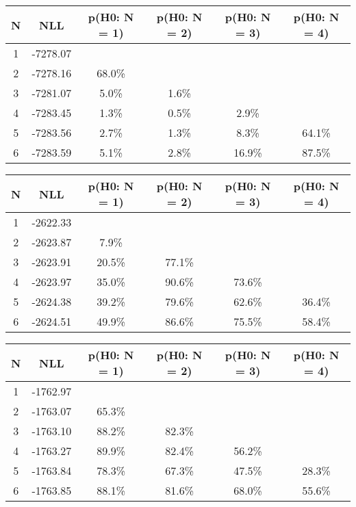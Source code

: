 \begin{table}[htb]
	\begin{center}
{\footnotesize\renewcommand{\arraystretch}{1.4}
		\begin{tabular}{cc||cccc}
			N & NLL & p(H0: N = 1) & p(H0: N = 2) & p(H0: N = 3) & p(H0: N = 4)\\ 
		\hline
1 & -7278.07 & & & & \\
2 & -7278.16 & 68.0\% & & & \\
3 & -7281.07 & 5.0\% & 1.6\% & & \\
4 & -7283.45 & 1.3\% & 0.5\% & 2.9\% & \\
5 & -7283.56 & 2.7\% & 1.3\% & 8.3\% & 64.1\% \\
6 & -7283.59 & 5.1\% & 2.8\% & 16.9\% & 87.5\% \\
	\end{tabular}
		\label{tab:lab}
	}
	\end{center}\end{table}

\begin{table}[htb]
	\begin{center}
{\footnotesize\renewcommand{\arraystretch}{1.4}
		\begin{tabular}{cc||cccc}
			N & NLL & p(H0: N = 1) & p(H0: N = 2) & p(H0: N = 3) & p(H0: N = 4)\\ 
		\hline
1 & -2622.33 & & & & \\
2 & -2623.87 & 7.9\% & & & \\
3 & -2623.91 & 20.5\% & 77.1\% & & \\
4 & -2623.97 & 35.0\% & 90.6\% & 73.6\% & \\
5 & -2624.38 & 39.2\% & 79.6\% & 62.6\% & 36.4\% \\
6 & -2624.51 & 49.9\% & 86.6\% & 75.5\% & 58.4\% \\
	\end{tabular}
		\label{tab:lab}
	}
	\end{center}\end{table}

\begin{table}[htb]
	\begin{center}
{\footnotesize\renewcommand{\arraystretch}{1.4}
		\begin{tabular}{cc||cccc}
			N & NLL & p(H0: N = 1) & p(H0: N = 2) & p(H0: N = 3) & p(H0: N = 4)\\ 
		\hline
1 & -1762.97 & & & & \\
2 & -1763.07 & 65.3\% & & & \\
3 & -1763.10 & 88.2\% & 82.3\% & & \\
4 & -1763.27 & 89.9\% & 82.4\% & 56.2\% & \\
5 & -1763.84 & 78.3\% & 67.3\% & 47.5\% & 28.3\% \\
6 & -1763.85 & 88.1\% & 81.6\% & 68.0\% & 55.6\% \\
	\end{tabular}
		\label{tab:lab}
	}
	\end{center}\end{table}


